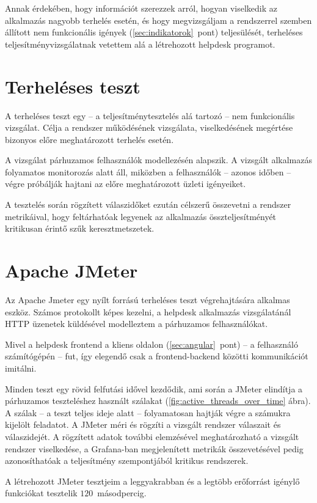 Annak érdekében, hogy információt szerezzek arról, hogyan viselkedik az alkalmazás nagyobb terhelés esetén, és hogy megvizsgáljam a rendszerrel szemben állított nem funkcionális igények  (\ref{sec:indikatorok}~pont)  teljesülését,	terheléses teljesítményvizsgálatnak vetettem alá a létrehozott helpdesk programot.


\section{Terheléses teszt}
A terheléses teszt egy --  a teljesítménytesztelés alá tartozó --   nem funkcionális vizsgálat. Célja a rendszer működésének vizsgálata, viselkedésének megértése bizonyos előre meghatározott terhelés esetén.

A vizsgálat párhuzamos felhasználók modellezésén alapszik. A vizsgált alkalmazás folyamatos monitorozás alatt áll, miközben a felhasználók --  azonos időben --   végre próbálják hajtani az előre meghatározott üzleti igényeiket.

A tesztelés során rögzített válaszidőket ezután célszerű összevetni a rendszer metrikáival, hogy feltárhatóak legyenek az alkalmazás összteljesítményét kritikusan érintő szűk keresztmetszetek.


\section{Apache JMeter}	
Az Apache Jmeter egy nyílt forrású terheléses teszt végrehajtására alkalmas eszköz. Számos protokollt képes kezelni, a helpdesk alkalmazás vizsgálatánál HTTP üzenetek küldésével modelleztem a párhuzamos felhasználókat.

Mivel a helpdesk frontend a kliens oldalon (\ref{sec:angular}~pont) --  a felhasználó számítógépén --   fut, így elegendő csak a frontend-backend közötti kommunikációt imitálni.

Minden teszt egy rövid felfutási idővel kezdődik, ami során a JMeter elindítja a párhuzamos teszteléshez használt szálakat (\ref{fig:active_threads_over_time} ábra). A szálak --  a teszt teljes ideje alatt --   folyamatosan hajtják végre a számukra kijelölt feladatot. A JMeter méri és rögzíti a vizsgált rendszer válaszait és válaszidejét. A rögzített adatok további elemzésével meghatározható a vizsgált rendszer viselkedése, a Grafana-ban megjelenített metrikák összevetésével pedig azonosíthatóak a teljesítmény szempontjából kritikus rendszerek.

A létrehozott JMeter tesztjeim a leggyakrabban és a legtöbb erőforrást igénylő funkciókat tesztelik $120$~másodpercig.


